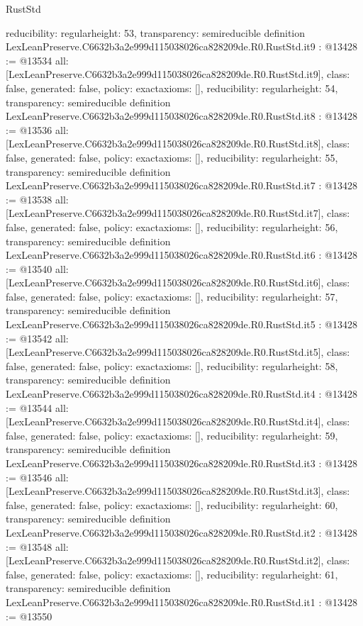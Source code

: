 \begin{lexlean}{RustStd}
\begin{coremodule}
{  reducibility: regular{height: 53},
  transparency: semireducible
}
definition LexLeanPreserve.C6632b3a2e999d115038026ca828209de.R0.RustStd.it9 : @13428 := @13534 {
  all: [LexLeanPreserve.C6632b3a2e999d115038026ca828209de.R0.RustStd.it9],
  class: false,
  generated: false,
  policy: exact{axioms: []},
  reducibility: regular{height: 54},
  transparency: semireducible
}
definition LexLeanPreserve.C6632b3a2e999d115038026ca828209de.R0.RustStd.it8 : @13428 := @13536 {
  all: [LexLeanPreserve.C6632b3a2e999d115038026ca828209de.R0.RustStd.it8],
  class: false,
  generated: false,
  policy: exact{axioms: []},
  reducibility: regular{height: 55},
  transparency: semireducible
}
definition LexLeanPreserve.C6632b3a2e999d115038026ca828209de.R0.RustStd.it7 : @13428 := @13538 {
  all: [LexLeanPreserve.C6632b3a2e999d115038026ca828209de.R0.RustStd.it7],
  class: false,
  generated: false,
  policy: exact{axioms: []},
  reducibility: regular{height: 56},
  transparency: semireducible
}
definition LexLeanPreserve.C6632b3a2e999d115038026ca828209de.R0.RustStd.it6 : @13428 := @13540 {
  all: [LexLeanPreserve.C6632b3a2e999d115038026ca828209de.R0.RustStd.it6],
  class: false,
  generated: false,
  policy: exact{axioms: []},
  reducibility: regular{height: 57},
  transparency: semireducible
}
definition LexLeanPreserve.C6632b3a2e999d115038026ca828209de.R0.RustStd.it5 : @13428 := @13542 {
  all: [LexLeanPreserve.C6632b3a2e999d115038026ca828209de.R0.RustStd.it5],
  class: false,
  generated: false,
  policy: exact{axioms: []},
  reducibility: regular{height: 58},
  transparency: semireducible
}
definition LexLeanPreserve.C6632b3a2e999d115038026ca828209de.R0.RustStd.it4 : @13428 := @13544 {
  all: [LexLeanPreserve.C6632b3a2e999d115038026ca828209de.R0.RustStd.it4],
  class: false,
  generated: false,
  policy: exact{axioms: []},
  reducibility: regular{height: 59},
  transparency: semireducible
}
definition LexLeanPreserve.C6632b3a2e999d115038026ca828209de.R0.RustStd.it3 : @13428 := @13546 {
  all: [LexLeanPreserve.C6632b3a2e999d115038026ca828209de.R0.RustStd.it3],
  class: false,
  generated: false,
  policy: exact{axioms: []},
  reducibility: regular{height: 60},
  transparency: semireducible
}
definition LexLeanPreserve.C6632b3a2e999d115038026ca828209de.R0.RustStd.it2 : @13428 := @13548 {
  all: [LexLeanPreserve.C6632b3a2e999d115038026ca828209de.R0.RustStd.it2],
  class: false,
  generated: false,
  policy: exact{axioms: []},
  reducibility: regular{height: 61},
  transparency: semireducible
}
definition LexLeanPreserve.C6632b3a2e999d115038026ca828209de.R0.RustStd.it1 : @13428 := @13550 {
}
\end{coremodule}
\end{lexlean}
